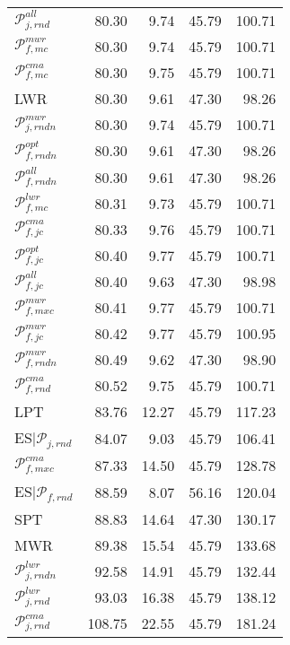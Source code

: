 \begin{tabular}{|@{}l@{}|@{}r@{}|@{}r@{}|@{}r@{}|@{}r@{}|}
${\mathcal{P}_{j,rnd}^{all}}$ &  80.30 &  9.74 &  45.79 &  100.71  \\ 
${\mathcal{P}_{f,mc}^{mwr}}$ &  80.30 &  9.74 &  45.79 &  100.71  \\ 
${\mathcal{P}_{f,mc}^{cma}}$ &  80.30 &  9.75 &  45.79 &  100.71  \\ 
LWR &  80.30 &  9.61 &  47.30 &  98.26  \\ 
${\mathcal{P}_{j,rndn}^{mwr}}$ &  80.30 &  9.74 &  45.79 &  100.71  \\ 
${\mathcal{P}_{f,rndn}^{opt}}$ &  80.30 &  9.61 &  47.30 &  98.26  \\ 
${\mathcal{P}_{f,rndn}^{all}}$ &  80.30 &  9.61 &  47.30 &  98.26  \\ 
${\mathcal{P}_{f,mc}^{lwr}}$ &  80.31 &  9.73 &  45.79 &  100.71  \\ 
\boldmath${\mathcal{P}_{f,jc}^{cma}}$ &  80.33 &  9.76 &  45.79 &  100.71  \\ 
\boldmath${\mathcal{P}_{f,jc}^{opt}}$ &  80.40 &  9.77 &  45.79 &  100.71  \\ 
\boldmath${\mathcal{P}_{f,jc}^{all}}$ &  80.40 &  9.63 &  47.30 &  98.98  \\ 
${\mathcal{P}_{f,mxc}^{mwr}}$ &  80.41 &  9.77 &  45.79 &  100.71  \\ 
\boldmath${\mathcal{P}_{f,jc}^{mwr}}$ &  80.42 &  9.77 &  45.79 &  100.95  \\ 
${\mathcal{P}_{f,rndn}^{mwr}}$ &  80.49 &  9.62 &  47.30 &  98.90  \\ 
${\mathcal{P}_{f,rnd}^{cma}}$ &  80.52 &  9.75 &  45.79 &  100.71  \\ \hline\hline
LPT &  83.76 &  12.27 &  45.79 &  117.23  \\ \hline\hline
ES$|{\mathcal{P}_{j,rnd}}$ &  84.07 &  9.03 &  45.79 &  106.41  \\ \hline\hline
${\mathcal{P}_{f,mxc}^{cma}}$ &  87.33 &  14.50 &  45.79 &  128.78  \\ \hline\hline
ES$|{\mathcal{P}_{f,rnd}}$ &  88.59 &  8.07 &  56.16 &  120.04  \\ \hline\hline
SPT &  88.83 &  14.64 &  47.30 &  130.17  \\ 
MWR &  89.38 &  15.54 &  45.79 &  133.68  \\ \hline\hline
${\mathcal{P}_{j,rndn}^{lwr}}$ &  92.58 &  14.91 &  45.79 &  132.44  \\ 
${\mathcal{P}_{j,rnd}^{lwr}}$ &  93.03 &  16.38 &  45.79 &  138.12  \\ \hline\hline
${\mathcal{P}_{j,rnd}^{cma}}$ &  108.75 &  22.55 &  45.79 &  181.24  \\ \hline
\end{tabular}
